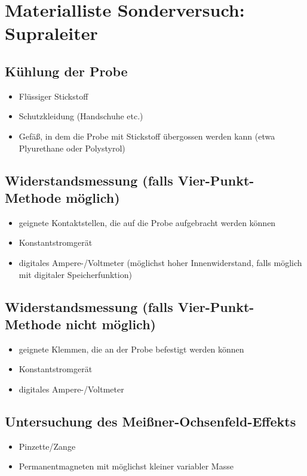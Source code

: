 


\section*{Materialliste Sonderversuch: Supraleiter}
\subsection*{Kühlung der Probe}
\begin{itemize}
  \item Flüssiger Stickstoff
  \item Schutzkleidung (Handschuhe etc.)
  \item Gefäß, in dem die Probe mit Stickstoff übergossen werden kann (etwa Plyurethane oder Polystyrol)
\end{itemize}

\subsection*{Widerstandsmessung (falls Vier-Punkt-Methode möglich)}
\begin{itemize}
  \item geignete Kontaktstellen, die auf die Probe aufgebracht werden können
  \item Konstantstromgerät
  \item digitales Ampere-/Voltmeter (möglichst hoher Innenwiderstand, falls möglich mit digitaler Speicherfunktion)
\end{itemize}

\subsection*{Widerstandsmessung (falls Vier-Punkt-Methode nicht möglich)}
\begin{itemize}
  \item geignete Klemmen, die an der Probe befestigt werden können
  \item Konstantstromgerät
  \item digitales Ampere-/Voltmeter
\end{itemize}

\subsection*{Untersuchung des Meißner-Ochsenfeld-Effekts}
\begin{itemize}
  \item Pinzette/Zange
  \item Permanentmagneten mit möglichst kleiner variabler Masse
\end{itemize}


